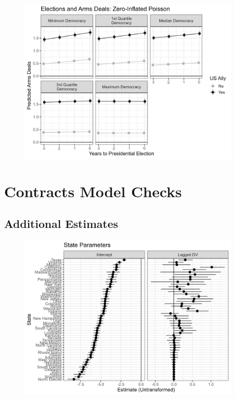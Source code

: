 \documentclass[12pt]{article}
\begin{document}
\begin{figure}[htpb]
	\centering
		\includegraphics[width=0.95\textwidth]{deals-pred-zip.png}
	\caption{}
	\label{fig:deals-pred-ols}
\end{figure}



\section{Contracts Model Checks} 


\subsection{Additional Estimates}


\begin{figure}[htpb]
	\centering
		\includegraphics[width=0.95\textwidth]{state-pars.png}
	\caption{}
	\label{fig:state-pars}
\end{figure}
\end{document}
